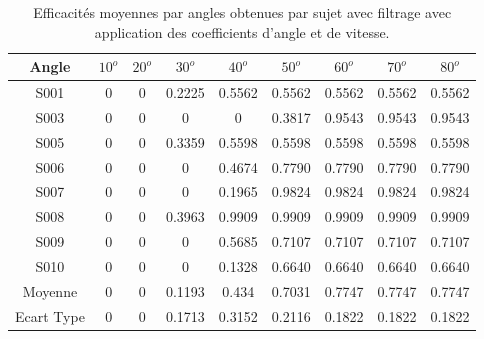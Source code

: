 \documentclass[letterpaper, twoside, 12pt, memoire, creativecommons, hyperref]{thETS}
\begin{document}
\begin{table}[ht]
	\caption{Efficacités moyennes par angles obtenues par sujet avec filtrage avec application des coefficients d'angle et de vitesse. }
		\begin{tabular}{|c|c|c|c|c|c|c|c|c|}
		\hline
			Angle & $10^{o}$ & $20^{o}$ & $30^{o}$ & $40^{o}$ & $50^{o}$ & $60^{o}$ & $70^{o}$ & $80^{o}$\\
	    \hline
	    		S001 & 0 &  0 & 0.2225 & 0.5562 & 0.5562 & 0.5562 & 0.5562 & 0.5562\\
	    \hline
	    		S003 & 0 &  0 &  0 &  0 & 0.3817 & 0.9543 & 0.9543 & 0.9543\\
	    \hline
	    		S005 & 0 &  0 & 0.3359 & 0.5598 & 0.5598 & 0.5598 & 0.5598 & 0.5598\\
	    \hline
	    		S006 & 0 &  0 &  0 & 0.4674 & 0.7790 & 0.7790 & 0.7790 & 0.7790\\
	    \hline
	    		S007 & 0 &  0 &  0 & 0.1965 & 0.9824 & 0.9824 & 0.9824 & 0.9824\\
	    \hline
	    		S008 & 0 &  0 & 0.3963 & 0.9909 & 0.9909 & 0.9909 & 0.9909 & 0.9909\\
	    \hline
	    		S009 & 0 &  0 &  0 & 0.5685 & 0.7107 & 0.7107 & 0.7107 & 0.7107\\
	    \hline
	    		S010 & 0 &  0 &  0 & 0.1328 & 0.6640 & 0.6640 & 0.6640 & 0.6640\\
	    \hline
	    		Moyenne & 0 & 0 & 0.1193 & 0.434 & 0.7031 & 0.7747 & 0.7747 & 0.7747\\
	    \hline
	    		Ecart Type & 0 & 0 & 0.1713 & 0.3152 & 0.2116 & 0.1822 & 0.1822 & 0.1822\\
	    \hline
		\end{tabular}
	\label{tab:effanglecoeff}
\end{table}
\end{document}
